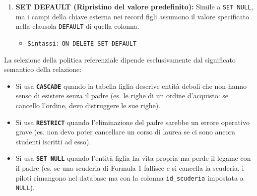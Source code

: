 \begin{enumerate}
    \item \textbf{SET DEFAULT (Ripristino del valore predefinito):}
    Simile a \texttt{SET NULL}, ma i campi della chiave esterna nei record figli assumono il valore specificato nella clausola \texttt{DEFAULT} di quella colonna.
    \begin{itemize}
        \item \texttt{Sintassi:} \texttt{ON DELETE SET DEFAULT}
    \end{itemize}
\end{enumerate}

\begin{observation}
La selezione della politica referenziale dipende esclusivamente dal significato semantico della relazione:
\begin{itemize}
    \item Si usa \textbf{\texttt{CASCADE}} quando la tabella figlia descrive entità deboli che non hanno senso di esistere senza il padre (es. le righe di un ordine d'acquisto: se cancello l'ordine, devo distruggere le sue righe).
    \item Si usa \textbf{\texttt{RESTRICT}} quando l'eliminazione del padre sarebbe un errore operativo grave (es. non devo poter cancellare un corso di laurea se ci sono ancora studenti iscritti ad esso).
    \item Si usa \textbf{\texttt{SET NULL}} quando l'entità figlia ha vita propria ma perde il legame con il padre (es. se una scuderia di Formula 1 fallisce e si cancella la scuderia, i piloti rimangono nel database ma con la colonna \texttt{id\_scuderia} impostata a \texttt{NULL}).
\end{itemize}
\end{observation}

